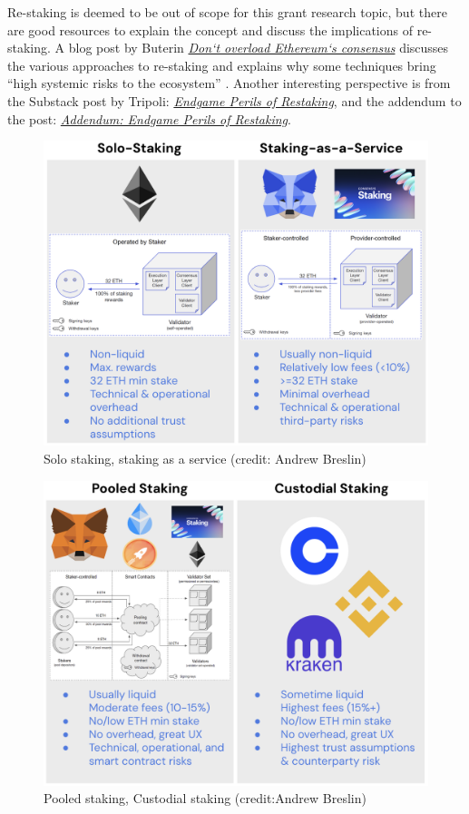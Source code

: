 \documentclass[UTF8]{article}
\begin{document}
Re-staking is deemed to be out of scope for this grant research topic, but there are good resources to explain the concept and discuss the implications of re-staking. A blog post by Buterin \href{https://vitalik.ca/general/2023/05/21/dont\_overload.html}{\textit{Don`t overload Ethereum`s consensus}} discusses the various approaches to re-staking and explains why some techniques bring ``high systemic risks to the ecosystem'' \cite{buterin2023a}. Another interesting perspective is from the Substack post by Tripoli: \href{https://dataalways.substack.com/p/endgame-perils-of-restaking}{\textit{Endgame Perils of Restaking}}, and the addendum to the post: \href{https://dataalways.substack.com/p/addendum-endgame-perils-of-restaking}{\textit{Addendum: Endgame Perils of Restaking}}.

\begin{figure}[htbp]
\begin{center}
\includegraphics[width=0.7\linewidth]{images/solo-saas}
\caption{Solo staking, staking as a service (credit: Andrew Breslin)}
\label{fig:solo}
\end{center}
\end{figure}

\begin{figure}[htbp]
\begin{center}
\includegraphics[width=0.7\linewidth]{images/pooled-custodial}
\caption{Pooled staking, Custodial staking (credit:Andrew Breslin)}
\label{fig:pooled}
\end{center}
\end{figure}
\end{document}
